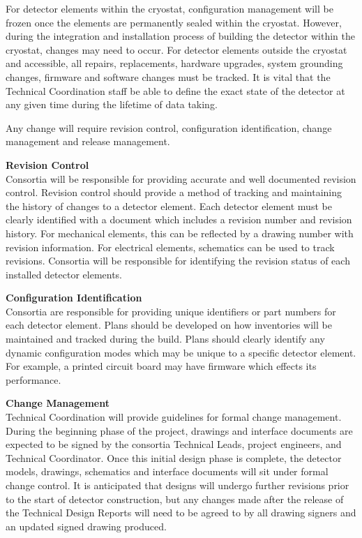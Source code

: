 For detector elements within the cryostat, configuration management
will be frozen once the elements are permanently sealed within the
cryostat.  However, during the integration and installation process of
building the detector within the cryostat, changes may need to occur.
For detector elements outside the cryostat and accessible, all
repairs, replacements, hardware upgrades, system grounding changes,
firmware and software changes must be tracked.  It is vital that the
Technical Coordination staff be able to define the exact state of the
detector at any given time during the lifetime of data taking.

Any change will require revision control, configuration
identification, change management and release management.

{\bf Revision Control}\\
Consortia will be responsible for providing accurate and well
documented revision control.  Revision control should provide a method
of tracking and maintaining the history of changes to a detector
element.  Each detector element must be clearly identified with a
document which includes a revision number and revision history.  For
mechanical elements, this can be reflected by a drawing number with
revision information.  For electrical elements, schematics can be used
to track revisions.  Consortia will be responsible for identifying the
revision status of each installed detector elements.

{\bf Configuration Identification}\\
Consortia are responsible for providing unique identifiers or part
numbers for each detector element.  Plans should be developed on how
inventories will be maintained and tracked during the build.  Plans
should clearly identify any dynamic configuration modes which may be
unique to a specific detector element.  For example, a printed circuit
board may have firmware which effects its performance.

{\bf Change Management}\\
Technical Coordination will provide guidelines
for formal change management.  During the beginning phase of the
project, drawings and interface documents are expected to be signed by
the consortia Technical Leads, project engineers, and Technical
Coordinator.  Once this initial design phase is complete, the detector
models, drawings, schematics and interface documents will sit under
formal change control.  It is anticipated that designs will undergo
further revisions prior to the start of detector construction, but any
changes made after the release of the Technical Design Reports will
need to be agreed to by all drawing signers and an updated signed
drawing produced.


